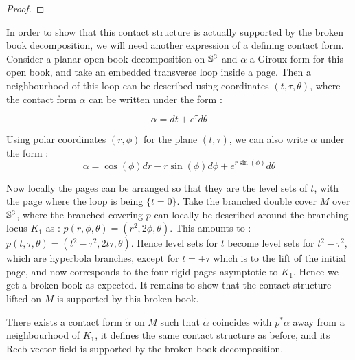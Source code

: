 \documentclass[../main.tex]{subfiles}
\begin{document}
\begin{proof}

\end{proof}


In order to show that this contact structure is actually supported by the broken book decomposition, we will need another expression of a defining contact form. \\
Consider a planar open book decomposition on $\mathbb{S}^3$ and $\alpha$ a Giroux form for this open book, and take an embedded transverse loop inside a page. Then a neighbourhood of this loop can be described using coordinates $(t,\tau,\theta)$, where the contact form $\alpha$ can be written under the form :

$$\alpha = dt+ e^{\tau} d\theta$$

Using polar coordinates $(r,\phi)$ for the plane $(t,\tau)$, we can also write $\alpha$ under the form : 
$$\alpha = \cos(\phi)dr -r\sin(\phi)d\phi + e^{r\sin(\phi)}d\theta$$

Now locally the pages can be arranged so that they are the level sets of $t$, with the page where the loop is being $\{t = 0\}$. Take the branched double cover $M$ over $\mathbb{S}^3$, where the branched covering $p$ can locally be described around the branching locus $K_1$ as : $p(r,\phi,\theta) = (r^ 2,2\phi,\theta)$. This amounts to : $p(t,\tau,\theta) = (t^2-\tau^2,2t\tau,\theta)$. Hence level sets for $t$ become level sets for $t^2-\tau^2$, which are hyperbola branches, except for $t = \pm\tau$ which is to the lift of the initial page, and now corresponds to the four rigid pages asymptotic to $K_1$. Hence we get a broken book as expected. It remains to show that the contact structure lifted on $M$ is supported by this broken book. 

\begin{lemma}
There exists a contact form $\tilde\alpha$ on $M$ such that $\tilde \alpha$ coincides with $p^*\alpha$ away from a neighbourhood of $K_1$, it defines the same contact structure as before, and its Reeb vector field is supported by the broken book decomposition.
\end{lemma}
\end{document}
